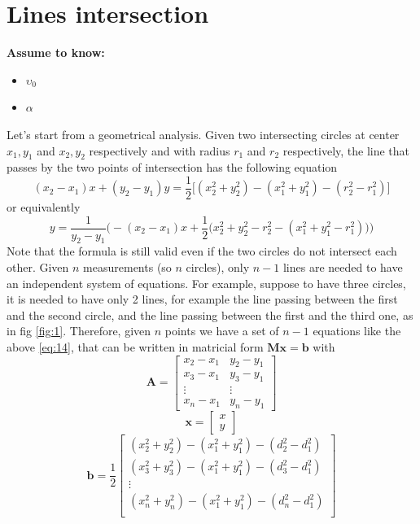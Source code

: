 \documentclass[12pt,twoside]{report}
\begin{document}
\section{Lines intersection}
  \begin{center}
  \textbf{Assume to know:}
  \begin{itemize}
    \centering
    \item $\upsilon_0$
    \item $\alpha$
  \end{itemize}
  \end{center}
Let's start from a geometrical analysis. Given two intersecting circles at center $x_{1},y_{1}$ and $x_{2},y_{2}$ respectively and with radius $r_1$ and $r_2$ respectively, the line that passes by the two points of intersection has the following equation \cite{rzk}
\begin{equation}
    (x_2-x_1)x+(y_2-y_1)y=\frac{1}{2}\big[(x_2^2+y_2^2)-(x_1^2+y_1^2)-(r_2^2-r_1^2)\big]
\end{equation}
or equivalently
\begin{equation}
    y=\frac{1}{y_2-y_1}\bigg(-(x_2-x_1)x+\frac{1}{2}\big(x_2^2+y_2^2-r_2^2-(x_1^2+y_1^2-r_1^2)\big)\bigg)
\end{equation}
Note that the formula is still valid even if the two circles do not intersect each other.
Given $n$ measurements (so $n$ circles), only $n-1$ lines are needed to have an independent system of equations. For example, suppose to have three circles, it is needed to have only 2 lines, for example the line passing between the first and the second circle, and the line passing between the first and the third one, as in fig \ref{fig:1}.
Therefore, given $n$ points we have a set of $n-1$ equations like the above \ref{eq:14}, that can be written in matricial form $\mathbf{Mx}=\mathbf{b}$ with
$$\mathbf{A}=\begin{bmatrix}
x_2-x_1&y_2-y_1\\
x_3-x_1&y_3-y_1\\
\vdots&\vdots\\
x_n-x_1&y_n-y_1
\end{bmatrix}$$
$$\mathbf{x}=\begin{bmatrix}
x\\
y
\end{bmatrix}$$
$$\mathbf{b}=\frac{1}{2}\begin{bmatrix}
(x^2_2+y^2_2)-(x_1^2+y^2_1)-(d_2^2-d_1^2)\\
(x^2_3+y^2_3)-(x_1^2+y^2_1)-(d_3^2-d_1^2)\\
\vdots\\
(x^2_n+y^2_n)-(x_1^2+y^2_1)-(d_n^2-d_1^2)\\
\end{bmatrix}$$
\end{document}
